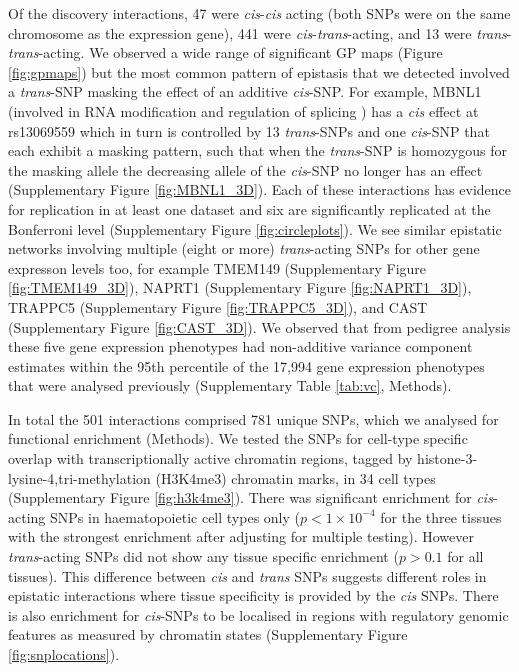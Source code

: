 \documentclass{article}
\begin{document}
Of the discovery interactions, 47 were \emph{cis}-\emph{cis} acting (both SNPs were on the same chromosome as the expression gene), 441 were \emph{cis}-\emph{trans}-acting, and 13 were \emph{trans}-\emph{trans}-acting. We observed a wide range of significant GP maps (Figure \ref{fig:gpmaps}) but the most common pattern of epistasis that we detected involved a \emph{trans}-SNP masking the effect of an additive \emph{cis}-SNP. For example, MBNL1 (involved in RNA modification and regulation of splicing \cite{Ho2004}) has a \emph{cis} effect at rs13069559 which in turn is controlled by 13 \emph{trans}-SNPs and one \emph{cis}-SNP that each exhibit a masking pattern, such that when the \emph{trans}-SNP is homozygous for the masking allele the decreasing allele of the \emph{cis}-SNP no longer has an effect (Supplementary Figure \ref{fig:MBNL1_3D}). Each of these interactions has evidence for replication in at least one dataset and six are significantly replicated at the Bonferroni level (Supplementary Figure \ref{fig:circleplots}). We see similar epistatic networks involving multiple (eight or more) \emph{trans}-acting SNPs for other gene expresson levels too, for example TMEM149 (Supplementary Figure \ref{fig:TMEM149_3D}), NAPRT1 (Supplementary Figure \ref{fig:NAPRT1_3D}), TRAPPC5 (Supplementary Figure \ref{fig:TRAPPC5_3D}), and CAST (Supplementary Figure \ref{fig:CAST_3D}). We observed that from pedigree analysis these five gene expression phenotypes had non-additive variance component estimates within the 95th percentile of the 17,994 gene expression phenotypes that were analysed previously \cite{Powell2013} (Supplementary Table \ref{tab:vc}, Methods).


In total the 501 interactions comprised 781 unique SNPs, which we analysed for functional enrichment (Methods). We tested the SNPs for cell-type specific overlap with transcriptionally active chromatin regions, tagged by histone-3-lysine-4,tri-methylation (H3K4me3) chromatin marks, in 34 cell types \cite{Trynka2013} (Supplementary Figure \ref{fig:h3k4me3}). There was significant enrichment for \emph{cis}-acting SNPs in haematopoietic cell types only ($p < 1 \times 10^{-4}$ for the three tissues with the strongest enrichment after adjusting for multiple testing). However \emph{trans}-acting SNPs did not show any tissue specific enrichment ($p > 0.1$ for all tissues). This difference between \emph{cis} and \emph{trans} SNPs suggests different roles in epistatic interactions where tissue specificity is provided by the \emph{cis} SNPs. There is also enrichment for \emph{cis}-SNPs to be localised in regions with regulatory genomic features as measured by chromatin states \cite{Hoffman2012} (Supplementary Figure \ref{fig:snplocations}).
\end{document}
